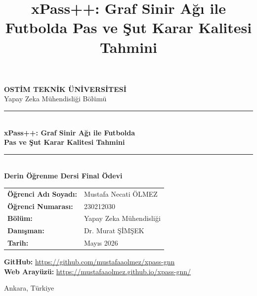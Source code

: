 \documentclass[conference]{IEEEtran}
\begin{document}
\begin{titlepage}
  \centering
  \vspace*{2cm}

  {\Large \textbf{OSTİM TEKNİK ÜNİVERSİTESİ}\\[0.3cm]
  Yapay Zeka Mühendisliği Bölümü}

  \vspace{1.5cm}
  \rule{\linewidth}{0.5mm}\\[0.4cm]

  {\LARGE \textbf{xPass++: Graf Sinir Ağı ile Futbolda\\[0.2cm]
  Pas ve Şut Karar Kalitesi Tahmini}}\\[0.2cm]

  \rule{\linewidth}{0.5mm}\\[1cm]

  {\large \textbf{Derin Öğrenme Dersi Final Ödevi}}

  \vspace{1.5cm}

  \begin{tabular}{ll}
    \textbf{Öğrenci Adı Soyadı:} & Mustafa Necati ÖLMEZ \\[0.3cm]
    \textbf{Öğrenci Numarası:}   & 230212030 \\[0.3cm]
    \textbf{Bölüm:}              & Yapay Zeka Mühendisliği \\[0.3cm]
    \textbf{Danışman:}           & Dr. Murat ŞİMŞEK \\[0.3cm]
    \textbf{Tarih:}              & Mayıs 2026 \\
  \end{tabular}

  \vspace{1.5cm}

  \textbf{GitHub:} \url{https://github.com/mustafaaolmez/xpass-gnn}\\[0.3cm]
  \textbf{Web Arayüzü:} \url{https://mustafaaolmez.github.io/xpass-gnn/}

  \vfill
  {\small Ankara, Türkiye}
\end{titlepage}

\title{xPass++: Graf Sinir Ağı ile Futbolda Pas ve Şut Karar Kalitesi Tahmini}

\author{
}
\end{document}
